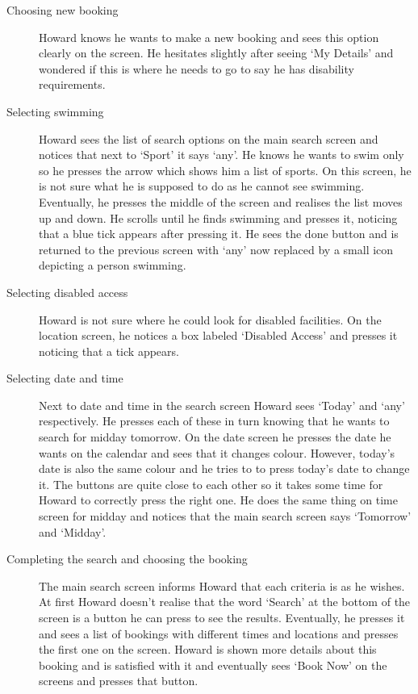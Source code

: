 \begin{description}
	\item[Choosing new booking] Howard knows he wants to make a new booking and
		sees this option clearly on the screen. He hesitates slightly after
		seeing `My Details' and wondered if this is where he needs to go to say
		he has disability requirements.

	\item[Selecting swimming] Howard sees the list of search options on the
		main search screen and notices that next to `Sport' it says `any'. He
		knows he wants to swim only so he presses the arrow which shows him a
		list of sports. On this screen, he is not sure what he is supposed to
		do as he cannot see swimming. Eventually, he presses the middle of the
		screen and realises the list moves up and down. He scrolls until he
		finds swimming and presses it, noticing that a blue tick appears after
		pressing it. He sees the done button and is returned to the previous
		screen with `any' now replaced by a small icon depicting a person
		swimming.

	\item[Selecting disabled access] Howard is not sure where he could look for
		disabled facilities. On the location screen, he notices a box labeled
		`Disabled Access' and presses it noticing that a tick appears.

	\item[Selecting date and time] Next to date and time in the search screen
		Howard sees `Today' and `any' respectively. He presses each of these in
		turn knowing that he wants to search for midday tomorrow. On the date
		screen he presses the date he wants on the calendar and sees that it
		changes colour. However, today's date is also the same colour and he
		tries to to press today's date to change it. The buttons are quite
		close to each other so it takes some time for Howard to correctly press
		the right one. He does the same thing on time screen for midday and
		notices that the main search screen says `Tomorrow' and `Midday'.

	\item[Completing the search and choosing the booking] The main search
		screen informs Howard that each criteria is as he wishes. At first
		Howard doesn't realise that the word `Search' at the bottom of the
		screen is a button he can press to see the results. Eventually, he
		presses it and sees a list of bookings with different times and
		locations and presses the first one on the screen. Howard is shown more
		details about this booking and is satisfied with it and eventually sees
		`Book Now' on the screens and presses that button.
\end{description}

